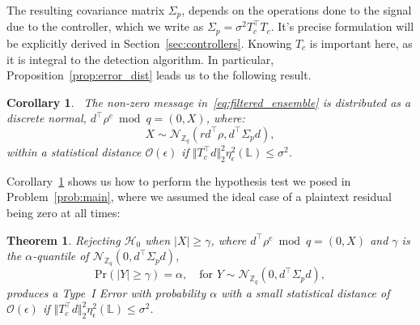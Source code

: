 \documentclass[journal, twoside, web]{ieeecolorpreprint}
\newtheorem{thm}{Theorem}
\newtheorem{cor}{Corollary}
\begin{document}
The resulting covariance matrix $\Sigma_p$, depends on the operations done to the signal due to the controller, which we write as $\Sigma_p=\sigma^2T_c^\top T_c$. It's precise formulation will be explicitly derived in Section~\ref{sec:controllers}. Knowing $T_c$ is important here, as it is integral to the detection algorithm. In particular, Proposition~\ref{prop:error_dist} leads us to the following result.
\begin{cor}~\label{cor:distribution_residual_weighted}
    The non-zero message in~\eqref{eq:filtered_ensemble} is distributed as a discrete normal, $d^\top\rho^e \bmod q =(0,X)$, where:
    \begin{equation}\label{eq:normal}
         X \sim \mathcal{N}_{\mathbb{Z}_q}(rd^\top \rho, d^\top \Sigma_p d),
    \end{equation}
    within a statistical distance $\mathcal{O}(\epsilon)$ if $\Vert T_c^\top d\Vert_2^2 \eta_\epsilon^2(\mathbb L) \leq \sigma^2$.
\end{cor}

Corollary~\ref{cor:distribution_residual_weighted} shows us how to perform the hypothesis test we posed in Problem~\ref{prob:main}, where we assumed the ideal case of a plaintext residual being zero at all times:
\begin{thm}\label{thm:main_theorem_rejection_rule}
    Rejecting $\mathcal{H}_0$ when $ \vert X \vert \geq \gamma$, where $d^\top\rho^e \bmod q =(0,X)$ and $\gamma$ is the $\alpha$-quantile of $\mathcal{N}_{\mathbb{Z}_q}(0,d^\top \Sigma_p d)$,
    \begin{equation}  \label{eq:false_alarm_triggering_rule}
    \mathrm{Pr}(\vert Y \vert\geq \gamma)=\alpha, \quad \text{for } Y \sim \mathcal{N}_{\mathbb{Z}_q}(0,d^\top \Sigma_p d),
    \end{equation}
    produces a Type~I Error with probability $\alpha$ with a small statistical distance of $\mathcal{O}(\epsilon)$ if $\Vert T_c^\top d\Vert_2^2 \eta_\epsilon^2(\mathbb L) \leq \sigma^2$.
\end{thm}
\end{document}
